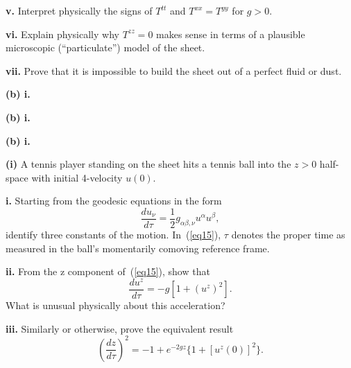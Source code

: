 \documentclass[a4paper]{article} %
\begin{document}
\begin{framed}
\textbf{v.} Interpret physically the signs of $T^{tt}$ and $T^{xx} = T^{yy}$ for $g > 0$.
\end{framed}

\begin{framed}
\textbf{vi.}  Explain physically why $T^{zz} = 0$ makes sense in terms of a plausible microscopic
(``particulate'') model of the sheet.
\end{framed}

\begin{framed}
\textbf{vii.} Prove that it is impossible to build the sheet out of a perfect fluid or dust.
\end{framed}

\begin{framed}
\textbf{(b) i.} 
\end{framed}

\begin{framed}
\textbf{(b) i.} 
\end{framed}

\begin{framed}
\textbf{(b) i.} 
\end{framed}

\begin{framed}
\textbf{(i)} A tennis player standing on the sheet hits a tennis ball into the $z>0$ half-space with initial 4-velocity $u(0)$.
\end{framed}

\begin{framed}
\textbf{i.} Starting from the geodesic equations in the form
\begin{equation}
\frac{du_{\nu}}{d\tau}=\frac{1}{2}g_{\alpha\beta,\nu}u^{\alpha}u^{\beta},\label{eq15}
\end{equation}
identify three constants of the motion. In~(\ref{eq15}), $\tau$ denotes the proper time as measured in the ball's momentarily comoving reference frame.
\end{framed}

\begin{framed}
\textbf{ii.} From the z component of~(\ref{eq15}), show that
\begin{equation}
\frac{du^z}{d\tau}=-g[1+(u^z)^2].\label{eq16}
\end{equation}
What is unusual physically about this acceleration?
\end{framed}

\begin{framed}
\textbf{iii.} Similarly or otherwise, prove the equivalent result
\begin{equation}
\left(\frac{dz}{d\tau}\right)^2=-1+e^{-2gz}\{1+[u^z(0)]^2\}.\label{eq17}
\end{equation}
\end{framed}
\end{document}
